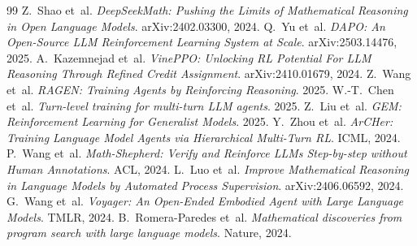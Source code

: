 \documentclass[11pt,a4paper]{article}
\begin{document}
\begin{thebibliography}{99}
 Z.~Shao et~al.
\emph{DeepSeekMath: Pushing the Limits of Mathematical Reasoning in
Open Language Models}. arXiv:2402.03300, 2024.
 Q.~Yu et~al.
\emph{DAPO: An Open-Source LLM Reinforcement Learning System at Scale}.
arXiv:2503.14476, 2025.
 A.~Kazemnejad et~al.
\emph{VinePPO: Unlocking RL Potential For LLM Reasoning Through Refined
Credit Assignment}. arXiv:2410.01679, 2024.
 Z.~Wang et~al. \emph{RAGEN: Training Agents by
Reinforcing Reasoning}. 2025.
 W.-T.~Chen et~al. \emph{Turn-level training for
multi-turn LLM agents}. 2025.
 Z.~Liu et~al. \emph{GEM: Reinforcement Learning
for Generalist Models}. 2025.
 Y.~Zhou et~al. \emph{ArCHer: Training
Language Model Agents via Hierarchical Multi-Turn RL}. ICML, 2024.
 P.~Wang et~al. \emph{Math-Shepherd:
Verify and Reinforce LLMs Step-by-step without Human Annotations}.
ACL, 2024.
 L.~Luo et~al. \emph{Improve Mathematical
Reasoning in Language Models by Automated Process Supervision}.
arXiv:2406.06592, 2024.
 G.~Wang et~al.
\emph{Voyager: An Open-Ended Embodied Agent with Large Language Models}.
TMLR, 2024.
 B.~Romera-Paredes et~al.
\emph{Mathematical discoveries from program search with large language
models}. Nature, 2024.
\end{thebibliography}
\end{document}
